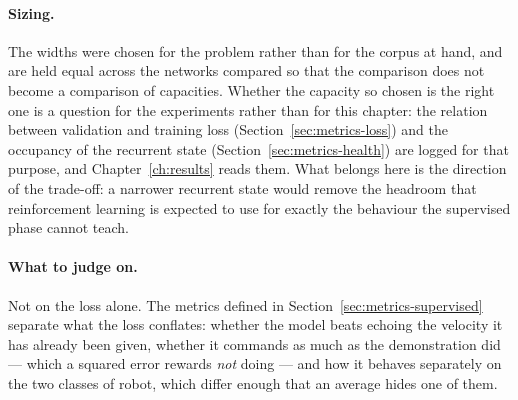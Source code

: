 \paragraph{Sizing.}
The widths were chosen for the problem rather than for the corpus at hand, and
are held equal across the networks compared so that the comparison does not
become a comparison of capacities. Whether the capacity so chosen is the right
one is a question for the experiments rather than for this chapter: the relation
between validation and training loss (Section~\ref{sec:metrics-loss}) and the
occupancy of the recurrent state (Section~\ref{sec:metrics-health}) are logged
for that purpose, and Chapter~\ref{ch:results} reads them. What belongs here is
the direction of the trade-off: a narrower recurrent state would remove the
headroom that reinforcement learning is expected to use for exactly the
behaviour the supervised phase cannot teach.

\paragraph{What to judge on.}
Not on the loss alone. The metrics defined in
Section~\ref{sec:metrics-supervised} separate what the loss conflates: whether
the model beats echoing the velocity it has already been given, whether it
commands as much as the demonstration did --- which a squared error rewards
\emph{not} doing --- and how it behaves separately on the two classes of robot,
which differ enough that an average hides one of them.
